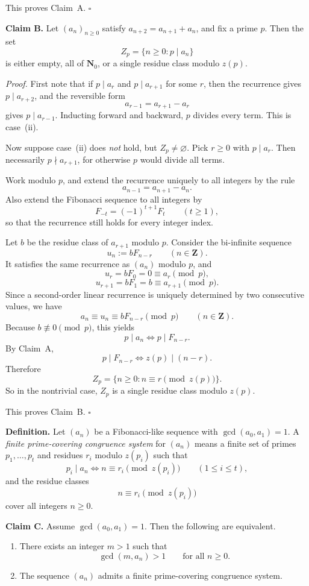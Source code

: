 This proves Claim~A.
\hfill$\square$

\medskip
\noindent\textbf{Claim B.} Let $(a_n)_{n\ge 0}$ satisfy $a_{n+2}=a_{n+1}+a_n$, and fix a prime $p$. Then the set
\[
Z_p=\{n\ge 0: p\mid a_n\}
\]
is either empty, all of $\mathbf{N}_0$, or a single residue class modulo $z(p)$.

\medskip
\noindent\emph{Proof.}
First note that if $p\mid a_r$ and $p\mid a_{r+1}$ for some $r$, then the recurrence gives $p\mid a_{r+2}$, and the reversible form
\[
a_{r-1}=a_{r+1}-a_r
\]
gives $p\mid a_{r-1}$. Inducting forward and backward, $p$ divides every term. This is case~(ii).

Now suppose case~(ii) does \emph{not} hold, but $Z_p\neq \varnothing$. Pick $r\ge 0$ with $p\mid a_r$. Then necessarily $p\nmid a_{r+1}$, for otherwise $p$ would divide all terms.

Work modulo $p$, and extend the recurrence uniquely to all integers by the rule
\[
a_{n-1}=a_{n+1}-a_n.
\]
Also extend the Fibonacci sequence to all integers by
\[
F_{-t}=(-1)^{t+1}F_t\qquad (t\ge 1),
\]
so that the recurrence still holds for every integer index.

Let $b$ be the residue class of $a_{r+1}$ modulo $p$. Consider the bi-infinite sequence
\[
u_n:=bF_{n-r}\qquad (n\in \mathbf{Z}).
\]
It satisfies the same recurrence as $(a_n)$ modulo $p$, and
\[
u_r=bF_0=0\equiv a_r\pmod p,
\]
\[
u_{r+1}=bF_1=b\equiv a_{r+1}\pmod p.
\]
Since a second-order linear recurrence is uniquely determined by two consecutive values, we have
\[
a_n\equiv u_n\equiv bF_{n-r}\pmod p
\qquad (n\in \mathbf{Z}).
\]
Because $b\not\equiv 0\pmod p$, this yields
\[
p\mid a_n \iff p\mid F_{n-r}.
\]
By Claim~A,
\[
p\mid F_{n-r} \iff z(p)\mid (n-r).
\]
Therefore
\[
Z_p=\{n\ge 0: n\equiv r\pmod{z(p)}\}.
\]
So in the nontrivial case, $Z_p$ is a single residue class modulo $z(p)$.

This proves Claim~B.
\hfill$\square$

\medskip
\noindent\textbf{Definition.} Let $(a_n)$ be a Fibonacci-like sequence with $\gcd(a_0,a_1)=1$. A \emph{finite prime-covering congruence system} for $(a_n)$ means a finite set of primes $p_1,\dots,p_t$ and residues $r_i$ modulo $z(p_i)$ such that
\[
p_i\mid a_n \iff n\equiv r_i\pmod{z(p_i)}
\qquad (1\le i\le t),
\]
and the residue classes
\[
n\equiv r_i\pmod{z(p_i)}
\]
cover all integers $n\ge 0$.

\medskip
\noindent\textbf{Claim C.} Assume $\gcd(a_0,a_1)=1$. Then the following are equivalent.
\begin{enumerate}
\item[(1)] There exists an integer $m>1$ such that
\[
\gcd(m,a_n)>1\qquad \text{for all } n\ge 0.
\]
\item[(2)] The sequence $(a_n)$ admits a finite prime-covering congruence system.
\end{enumerate}


